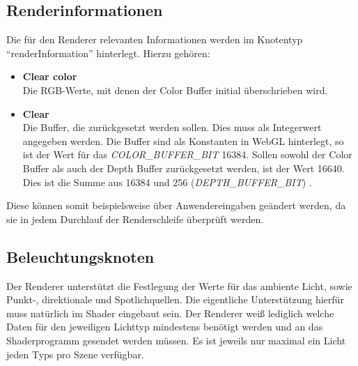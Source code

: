 \subsection{Renderinformationen}
Die für den Renderer relevanten Informationen werden im Knotentyp "`renderInformation"' hinterlegt. Hierzu gehören:
\begin{itemize}
    \item \textbf{Clear color}\\
Die RGB-Werte, mit denen der Color Buffer initial überschrieben wird.
    \item \textbf{Clear}\\
Die Buffer, die zurückgesetzt werden sollen. Dies muss als Integerwert angegeben werden. Die Buffer sind als Konstanten in WebGL hinterlegt, so ist der Wert für das \textit{COLOR\-\_BUFFER\-\_BIT} 16384. Sollen sowohl der Color Buffer als auch der Depth Buffer zurückgesetzt werden, ist der Wert 16640. Dies ist die Summe aus 16384 und 256 (\textit{DEPTH\-\_BUFFER\-\_BIT}) \autocite{WebGLSpec}.
\end{itemize}
Diese können somit beispielsweise über Anwendereingaben geändert werden, da sie in jedem Durchlauf der Renderschleife überprüft werden.

\subsection{Beleuchtungsknoten}
Der Renderer unterstützt die Festlegung der Werte für das ambiente Licht, sowie Punkt-, direktionale und Spotlichquellen. Die eigentliche Unterstützung hierfür muss natürlich im Shader eingebaut sein. Der Renderer weiß lediglich welche Daten für den jeweiligen Lichttyp mindestens benötigt werden und an das Shaderprogramm gesendet werden müssen. Es ist jeweils nur maximal ein Licht jeden Typs pro Szene verfügbar.
